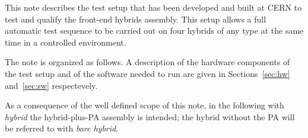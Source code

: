 This note describes the test setup that has been developed and built
at CERN to test and qualify the front-end hybrids assembly.
This setup allows a full automatic test sequence to be carried out on
four hybrids of any type at the same time in a controlled environment.

The note is organized as follows. A description of the hardware
components of the test setup and of the software needed to run are
given in Sections~\ref{sec:hw} and~\ref{sec:sw} respectevely.

As a consequence of the well defined scope of this note, in the
following with {\em hybrid} the hybrid-plus-PA assembly is intended;
the hybrid without the PA will be referred to with {\em bare hybrid}.

